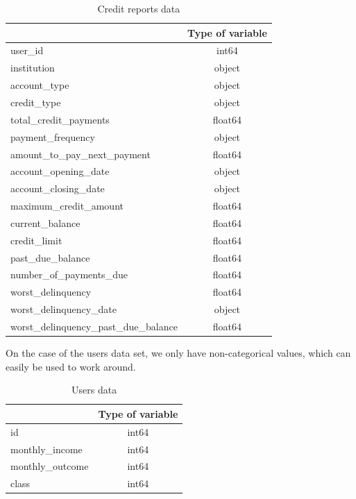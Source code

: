\documentclass[a4paper,12pt]{article}
\begin{document}
\begin{table}[h!]
  \centering
  \caption{Credit reports data}
    \begin{tabular}{|l|c|}
    \hline
    \rowcolor[rgb]{ .631,  .325,  .725} \multicolumn{1}{|c|}{\textcolor[rgb]{ 1,  1,  1}{Variable}} & \textcolor[rgb]{ 1,  1,  1}{Type of variable} \\
    \hline
    user\_id  & int64 \\
    \hline
    institution & object \\
    \hline
    account\_type & object \\
    \hline
    credit\_type & object \\
    \hline
    total\_credit\_payments & float64 \\
    \hline
    payment\_frequency & object \\
    \hline
    amount\_to\_pay\_next\_payment & float64 \\
    \hline
    account\_opening\_date & object \\
    \hline
    account\_closing\_date & object \\
    \hline
    maximum\_credit\_amount & float64 \\
    \hline
    current\_balance &  float64 \\
    \hline
    credit\_limit & float64 \\
    \hline
    past\_due\_balance & float64 \\
    \hline
    number\_of\_payments\_due & float64 \\
    \hline
    worst\_delinquency & float64 \\
    \hline
    worst\_delinquency\_date & object \\
    \hline
    worst\_delinquency\_past\_due\_balance & float64 \\
    \hline
    \end{tabular}%
  \label{tab:CRtable}%
\end{table}%

On the case of the users data set, we only have non-categorical values, which can easily be used to work around.


\begin{table}[h!]
  \centering
  \caption{Users data}
    \begin{tabular}{|l|c|}
    \hline
    \rowcolor[rgb]{ .631,  .325,  .725} \multicolumn{1}{|c|}{\textcolor[rgb]{ 1,  1,  1}{Variable}} & \textcolor[rgb]{ 1,  1,  1}{Type of variable} \\
    \hline
    id    & int64 \\
    \hline
    monthly\_income & int64 \\
    \hline
    monthly\_outcome & int64 \\
    \hline
    class & int64 \\
    \hline
    \end{tabular}%
  \label{tab:Utable}%
\end{table}\newpage
\end{document}
